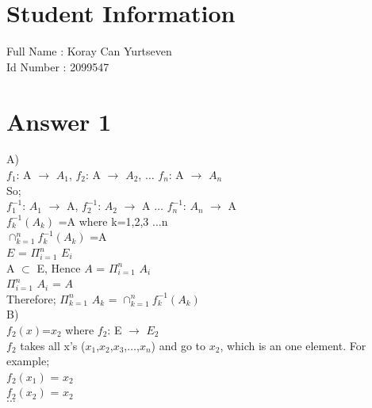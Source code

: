 \documentclass[12pt]{article}
\begin{document}
\section*{Student Information } 
Full Name :  Koray Can Yurtseven\\
Id Number :  2099547\\

\section*{Answer 1}
A)\\

$f_1$: A $\rightarrow$ $A_1$,
$f_2$: A $\rightarrow$ $A_2$,
$\dots$
$f_n$: A $\rightarrow$ $A_n$ \\

So; \\

$f_1^{-1}$: $A_1$ $\rightarrow$ A,
$f_2^{-1}$: $A_2$ $\rightarrow$ A 
$\dots$
$f_n^{-1}$: $A_n$ $\rightarrow$ A\\

$f_k^{-1}$$(A_k)$ =A  where k=1,2,3 $\dots$n\\

$\cap^n_{k=1}$$f_k^{-1}$$(A_k)$ =A\\

$E$ = $\Pi^n_{i=1}$ $E_i$\\

A $\subset$ E, Hence $A$ = $\Pi^n_{i=1}$ $A_i$\\

$\Pi^n_{i=1}$ $A_i$ = $A$\\

Therefore; $\Pi^n_{k=1}$ $A_k$ = $\cap^n_{k=1}$$f_k^{-1}$$(A_k)$\\
B)\\

$f_2(x)$=$x_2$	where	$f_2$: E $\rightarrow$ $E_2$\\

$f_2$ takes all x's ($x_1$,$x_2$,$x_3$,$\dots$,$x_n$) and go to $x_2$, which is an one element. For example;\\

$f_2$$(x_1)$ = $x_2$\\

$f_2$$(x_2)$ = $x_2$\\

$\dots$\\
\end{document}
